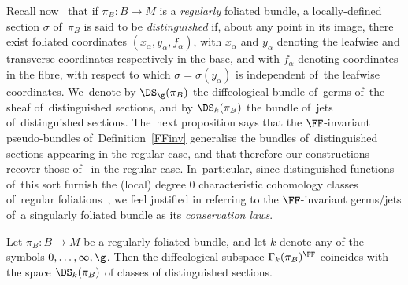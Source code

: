 Recall now~\cite[Definition~2.10]{mac3} that if $\pi_{B}\colon B\rightarrow M$ is a \textit{regularly} foliated bundle, a locally-defined section $\sigma$ of~$\pi_{B}$ is said to be \textit{distinguished} if, about any point in its image, there exist foliated coordinates $(x_{\alpha},y_{\alpha},f_{\alpha})$, with $x_{\alpha}$ and $y_{\alpha}$ denoting the leafwise and transverse coordinates respectively in the base, and with $f_{\alpha}$ denoting coordinates in the fibre, with respect to which $\sigma = \sigma(y_{\alpha})$ is independent of~the leafwise coordinates. We~denote by $\DS_{\g}(\pi_{B})$ the diffeological bundle of~germs of~the sheaf of~distinguished sections, and by $\DS_{k}(\pi_{B})$ the bundle of~jets of~distinguished sections. The~next proposition says that the $\FF$-invariant pseudo-bundles of~Defi\-ni\-tion~\ref{FFinv} generalise the bundles of~distinguished sections appearing in the regular case, and that therefore our constructions recover those of~\cite{mac3} in the regular case. In~particular, since distinguished functions of~this sort furnish the (local) degree 0 characteristic cohomology classes of~regular foliations~\cite[Example 1]{bryantgriffiths1}, we feel justified in referring to the $\FF$-invariant germs/jets of~a singularly foliated bundle as its \textit{conservation laws}.

\begin{Proposition}%
Let $\pi_{B}\colon B\rightarrow M$ be a regularly foliated bundle, and let $k$ denote any of the symbols $0,\dots,\infty,\g$. Then the diffeological subspace $\Gamma_{k}(\pi_{B})^{\FF}$ coincides with the space $\DS_{k}(\pi_{B})$ of classes of distinguished sections.
\end{Proposition}

